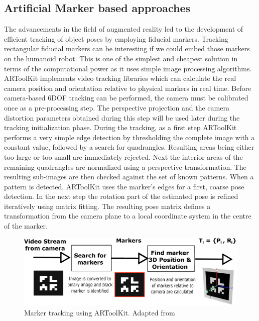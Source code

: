 \subsection{Artificial Marker based approaches}
The advancements in the field of augmented reality led to the development of efficient tracking of object poses by employing fiducial markers. Tracking rectangular fiducial markers can be interesting if we could embed those markers on the humanoid robot. This is one of the simplest and cheapest solution in terms of the computational power as it uses simple image processing algorithms. ARToolKit \cite{kato1999marker} implements video tracking libraries which can calculate the real camera position and orientation relative to physical markers in real time. Before camera-based 6DOF tracking can be performed, the camera must be calibrated once as a pre-processing step. The perspective projection and the camera distortion parameters obtained during this step will be used later during the tracking initialization phase. During the tracking, as a first step ARToolKit performs a very simple edge detection by thresholding the complete image with a constant value, followed by a search for quadrangles. Resulting areas being either too large or too small are immediately rejected. Next the interior areas of the remaining quadrangles are normalized using a perspective transformation. The resulting sub-images are then checked against the set of known patterns. When a pattern is detected, ARToolKit uses the marker’s edges for a first, coarse pose detection. In the next step the rotation part of the estimated pose is refined iteratively using matrix fitting. The resulting pose matrix defines a transformation from the camera plane to a local coordinate system in the centre of the marker.
\begin{figure}[H]
\centering
\includegraphics[width=1\textwidth]{assets/artoolkit.eps}
\caption[Marker tracking using ARToolKit]{Marker tracking using ARToolKit. {Adapted from \cite{kato1999marker}}}
\label{fig:artoolkit}
\end{figure}
